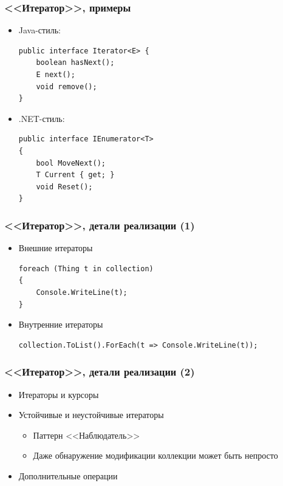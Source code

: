 \documentclass{../../slides-style}
\begin{document}
    \begin{frame}[fragile]
        \frametitle{<<Итератор>>, примеры}
        \begin{itemize}
            \item Java-стиль:
            \begin{verbatim}
public interface Iterator<E> {
    boolean hasNext();
    E next();
    void remove();
}
            \end{verbatim}
            \item .NET-стиль:
            \begin{verbatim}
public interface IEnumerator<T>
{
    bool MoveNext();
    T Current { get; }
    void Reset();
}
            \end{verbatim}
        \end{itemize}
    \end{frame}

    \begin{frame}[fragile]
        \frametitle{<<Итератор>>, детали реализации (1)}
        \begin{itemize}
            \item Внешние итераторы
            \begin{verbatim}
foreach (Thing t in collection)
{
    Console.WriteLine(t);
} 
            \end{verbatim}
            \item Внутренние итераторы
            \begin{verbatim}
collection.ToList().ForEach(t => Console.WriteLine(t));
            \end{verbatim}
        \end{itemize}
    \end{frame}

    \begin{frame}
        \frametitle{<<Итератор>>, детали реализации (2)}
        \begin{itemize}
            \item Итераторы и курсоры
            \item Устойчивые и неустойчивые итераторы
            \begin{itemize}
                \item Паттерн <<Наблюдатель>>
                \item Даже обнаружение модификации коллекции может быть непросто
            \end{itemize}
            \item Дополнительные операции
        \end{itemize}
    \end{frame}
\end{document}
